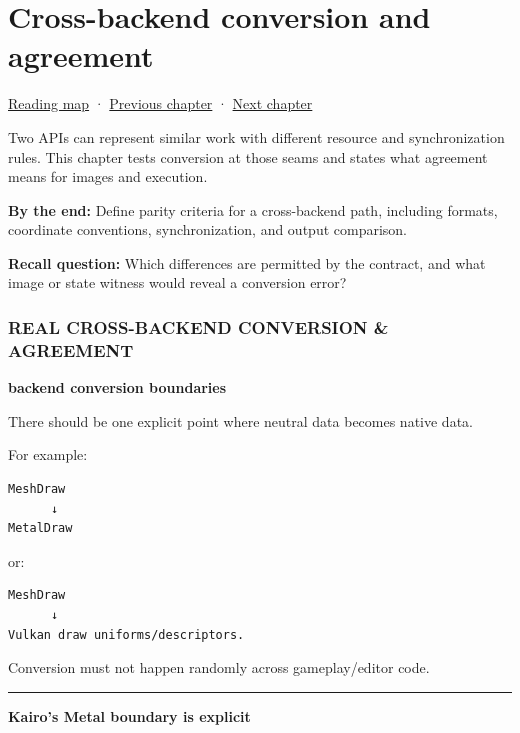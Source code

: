 \chapter{Cross-backend conversion and agreement}\label{06-engine-ii-ch044-cross-backend-conversion-and-agreement}\hypertarget{06-engine-ii-ch044}{}\label{stagechapter:06-engine-ii-ch044}

\hyperref[volume-reading-map]{Reading map} · \hyperref[06-engine-ii-ch043-compiling-renderer-intent-into-backend-work]{Previous chapter} · \hyperref[06-engine-ii-ch045-rasterizing-kernels-and-connecting-world-identity]{Next chapter}

Two APIs can represent similar work with different resource and synchronization rules. This chapter tests conversion at those seams and states what agreement means for images and execution.

\textbf{By the end:} Define parity criteria for a cross-backend path, including formats, coordinate conventions, synchronization, and output comparison.

\textbf{Recall question:} Which differences are permitted by the contract, and what image or state witness would reveal a conversion error?

\subsection{REAL CROSS-BACKEND CONVERSION \& AGREEMENT}\label{06-engine-ii-ch044-real-cross-backend-conversion-agreement}

\textbf{backend conversion boundaries}

There should be one explicit point where neutral data becomes native data.

For example:

\begin{verbatim}
MeshDraw
      ↓
MetalDraw
\end{verbatim}

or:

\begin{verbatim}
MeshDraw
      ↓
Vulkan draw uniforms/descriptors.
\end{verbatim}

Conversion must not happen randomly across gameplay/editor code.

\begin{center}\rule{0.5\linewidth}{0.5pt}\end{center}

\textbf{Kairo's Metal boundary is explicit}

